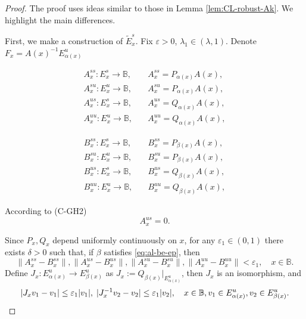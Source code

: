 \documentclass[12pt]{article}
\newcommand{\Bb}{\mathbb{B}}
\theoremstyle{definition}
\begin{document}
\begin{proof}
The proof uses ideas similar to those in Lemma \ref{lem:CL-robust-Ak}. We highlight the main differences. 
    
    First, we make a construction of $\tilde{E}^s_x$. Fix $\varepsilon >0$, $\lambda_1 \in (\lambda, 1)$. Denote $F_x = A(x)^{-1}E^u_{\alpha(x)}$

\begin{minipage}{0.49\textwidth}
\begin{align*}
A_x^{ss}: E_x^s \to \Bb, & \quad  A_x^{ss} = P_{\alpha(x)}A(x),\\
A_x^{su}: E_x^u \to \Bb, & \quad  A_x^{su} = P_{\alpha(x)}A(x),\\
A_x^{us}: E_x^s \to \Bb, & \quad  A_x^{us} = Q_{\alpha(x)}A(x),\\
A_x^{uu}: E_x^u \to \Bb, & \quad  A_x^{uu} = Q_{\alpha(x)}A(x),
\end{align*}   
\end{minipage}
\hfill
\begin{minipage}{0.49\textwidth}
\begin{align*}
B_x^{ss}: E_x^s \to \Bb, & \quad  B_x^{ss} = P_{\beta(x)}A(x),\\
B_x^{su}: E_x^u \to \Bb, & \quad  B_x^{su} = P_{\beta(x)}A(x),\\
B_x^{us}: E_x^s \to \Bb, & \quad  B_x^{us} = Q_{\beta(x)}A(x),\\
B_x^{uu}: E_x^u \to \Bb, & \quad  B_x^{uu} = Q_{\beta(x)}A(x),
\end{align*}
\end{minipage}

\smallskip 
According to (C-GH2) 
\begin{equation}\label{eq:Asux}
A^{us}_x = 0.
\end{equation}


Since $P_x, Q_x$ depend uniformly continuously on $x$, for any $\varepsilon_1 \in (0, 1)$ there exists $\delta > 0$ such that, if $\beta$ satisfies \eqref{eq:al-be-ep}, then
\begin{equation}\label{eq:AB-ep1}
\|A_x^{ss} - B_x^{ss}\|, \|A_x^{us} - B_x^{us}\|,\|A_x^{su} - B_x^{su}\|,\|A_x^{uu} - B_x^{uu}\| < \varepsilon_1, \quad x \in \Bb.   
\end{equation}
Define $J_x: E^u_{\alpha(x)} \to E^u_{\beta(x)}$ as $J_x := Q_{\beta(x)}|_{E^u_{\alpha(x)}}$, then $J_x$ is an isomorphism, and 
\begin{equation}\notag%
|J_x v_1 - v_1| \leq \varepsilon_1 |v_1|, \; |J^{-1}_x v_2 - v_2| \leq \varepsilon_1 |v_2|, \quad x \in \Bb, v_1 \in E^u_{\alpha(x)}, v_2 \in E^u_{\beta(x)}.
\end{equation}


\end{proof}
\end{document}
